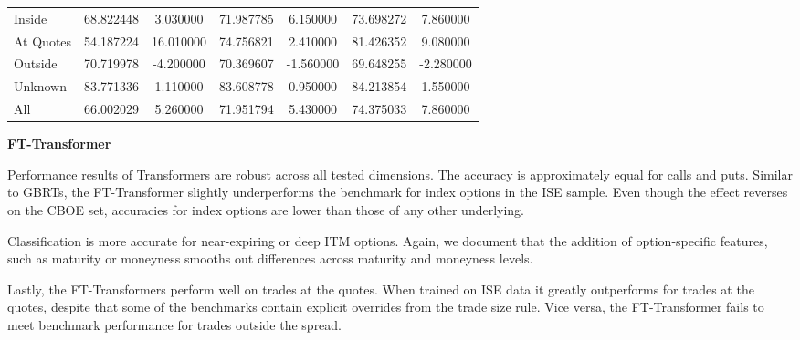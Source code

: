 \begin{table}[h!]
\begin{tabular}{lSSSSSS@{}}
        \tabindent Inside          & 68.822448                                        & 3.030000                                              & 71.987785                                     & 6.150000  & 73.698272    & 7.860000  \\
        \tabindent At Quotes       & 54.187224                                        & 16.010000                                             & 74.756821                                     & 2.410000  & 81.426352    & 9.080000  \\
        \tabindent Outside         & 70.719978                                        & -4.200000                                             & 70.369607                                     & -1.560000 & 69.648255    & -2.280000 \\
        \tabindent Unknown         & 83.771336                                        & 1.110000                                              & 83.608778                                     & 0.950000  & 84.213854    & 1.550000  \\
        \cmidrule(rl){1-7}
All             & 66.002029                                        & 5.260000                                              & 71.951794                                     & 5.430000  & 74.375033    & 7.860000  \\
        \bottomrule
    \end{tabular}
\end{table}

\clearpage

\textbf{FT-Transformer}

Performance results of Transformers are robust across all tested dimensions. The accuracy is approximately equal for calls and puts. Similar to \glspl{GBRT}, the FT-Transformer slightly underperforms the benchmark for index options in the \gls{ISE} sample. Even though the effect reverses on the \gls{CBOE} set, accuracies for index options are lower than those of any other underlying.

Classification is more accurate for near-expiring or deep \gls{ITM} options. Again, we document that the addition of option-specific features, such as maturity or moneyness smooths out differences across maturity and moneyness levels.

Lastly, the FT-Transformers perform well on trades at the quotes. When trained on \gls{ISE} data it greatly outperforms for trades at the quotes, despite that some of the benchmarks contain explicit overrides from the trade size rule. Vice versa, the FT-Transformer fails to meet benchmark performance for trades outside the spread.

